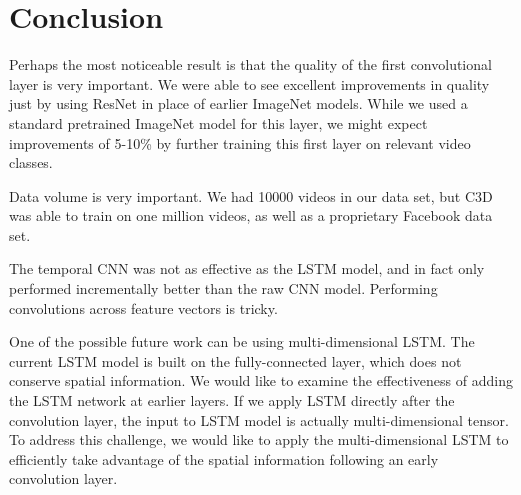 \section{Conclusion}
Perhaps the most noticeable result is that the quality of the first convolutional layer is very important. We were able to see excellent improvements in quality just by using ResNet in place of earlier ImageNet models. While we used a standard pretrained ImageNet model for this layer, we might expect improvements of 5-10\% by further training this first layer on relevant video classes. 

Data volume is very important. We had 10000 videos in our data set, but C3D was able to train on one million videos, as well as a proprietary Facebook data set.

The temporal CNN was not as effective as the LSTM model, and in fact only performed incrementally better than the raw CNN model. Performing convolutions across feature vectors is tricky. 

One of the possible future work can be using multi-dimensional LSTM. The current LSTM model is built on the fully-connected layer, which does not conserve spatial information. We would like to examine the effectiveness of adding the LSTM network at earlier layers. If we apply LSTM directly after the convolution layer, the input to LSTM model is actually multi-dimensional tensor. To address this challenge, we would like to apply the multi-dimensional LSTM
\cite{byeon2015scene} to efficiently take advantage of the spatial information following an early convolution layer. 
